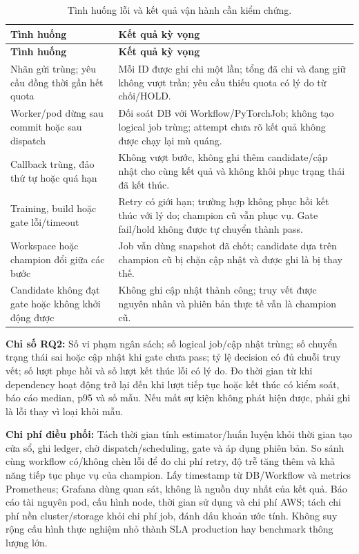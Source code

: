 \begin{xltabular}{\linewidth}{@{}L{3.6cm} Y@{}}
\caption{Tình huống lỗi và kết quả vận hành cần kiểm chứng.}\label{tab:fault-tests}\\
\toprule\textbf{Tình huống} & \textbf{Kết quả kỳ vọng} \\
\midrule\endfirsthead
\toprule\textbf{Tình huống} & \textbf{Kết quả kỳ vọng} \\
\midrule\endhead
Nhãn gửi trùng; yêu cầu đồng thời gần hết quota & Mỗi ID được ghi chi một lần; tổng đã chi và đang giữ không vượt trần; yêu cầu thiếu quota có lý do từ chối/HOLD. \\
Worker/pod dừng sau commit hoặc sau dispatch & Đối soát DB với Workflow/PyTorchJob; không tạo logical job trùng; attempt chưa rõ kết quả không được chạy lại mù quáng. \\
Callback trùng, đảo thứ tự hoặc quá hạn & Không vượt bước, không ghi thêm candidate/cập nhật cho cùng kết quả và không khôi phục trạng thái đã kết thúc. \\
Training, build hoặc gate lỗi/timeout & Retry có giới hạn; trường hợp không phục hồi kết thúc với lý do; champion cũ vẫn phục vụ. Gate fail/hold không được tự chuyển thành pass. \\
Workspace hoặc champion đổi giữa các bước & Job vẫn dùng snapshot đã chốt; candidate dựa trên champion cũ bị chặn cập nhật và được ghi là bị thay thế. \\
Candidate không đạt gate hoặc không khởi động được & Không ghi cập nhật thành công; truy vết được nguyên nhân và phiên bản thực tế vẫn là champion cũ. \\
\bottomrule
\end{xltabular}

\textbf{Chỉ số RQ2:} Số vi phạm ngân sách; số logical job/cập nhật trùng; số chuyển trạng thái sai hoặc cập nhật khi gate chưa pass; tỷ lệ decision có đủ chuỗi truy vết; số lượt phục hồi và số lượt kết thúc lỗi có lý do. Đo thời gian từ khi dependency hoạt động trở lại đến khi lượt tiếp tục hoặc kết thúc có kiểm soát, báo cáo median, p95 và số mẫu. Nếu mất sự kiện không phát hiện được, phải ghi là lỗi thay vì loại khỏi mẫu.

\textbf{Chi phí điều phối:} Tách thời gian tính estimator/huấn luyện khỏi thời gian tạo cửa sổ, ghi ledger, chờ dispatch/scheduling, gate và áp dụng phiên bản. So sánh cùng workflow có/không chèn lỗi để đo chi phí retry, độ trễ tăng thêm và khả năng tiếp tục phục vụ của champion. Lấy timestamp từ DB/Workflow và metrics Prometheus; Grafana dùng quan sát, không là nguồn duy nhất của kết quả. Báo cáo tài nguyên pod, cấu hình node, thời gian sử dụng và chi phí AWS; tách chi phí nền cluster/storage khỏi chi phí job, đánh dấu khoản ước tính. Không suy rộng cấu hình thực nghiệm nhỏ thành SLA production hay benchmark thông lượng lớn.

